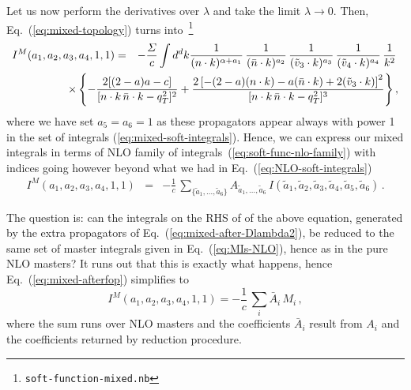 \documentclass[a4paper,11pt]{report}
\numberwithin{equation}{section}
\newcommand{\mixed}{{M}}
\newcommand{\mycite}[1]{{\footnote{\tt  #1}}}
\begin{document}
Let us now perform the derivatives over $\lambda$ and take the limit $\lambda
\to 0$.  Then, Eq.~(\ref{eq:mixed-topology}) turns
into~\mycite{soft-function-mixed.nb}
%
\begin{eqnarray}
  I^\mixed(a_1, a_2, a_3, a_4, 1, 1)
  & = &
  - \frac{\Sigma}{c}
  \int d^d k
  \frac{1}{(n\cdot k)^{\alpha+a_1}}\,
  \frac{1}{(\nbar \cdot k)^{a_2}}\,
  \frac{1}{(\tilde v_3 \cdot k)^{a_3}}\,
  \frac{1}{(\tilde v_4 \cdot k)^{a_4}}\,
  \frac{1}{k^2}\,
  \nonumber \\
  & & 
  \hspace{-70pt}
  \times
  \left\{
    -\frac{2[(2-a)a-c]}{[ n \cdot k\, \nbar \cdot k - q_T^2]^{2}}
    +\frac{2\left[-(2-a) (n\cdot k) -a (\nbar\cdot k)+ 
    2(\tilde v_3\cdot k)\right]^2}{[ n \cdot k\, \nbar \cdot k - 
    q_T^2]^{3}}
  \right\},
  \label{eq:mixed-after-Dlambda2}
\end{eqnarray}
%
where we have set $a_5=a_6=1$ as these propagators appear always with power 1 in
the set of integrals (\ref{eq:mixed-soft-integrals}).
%
Hence, we can express our mixed integrals in terms of NLO family of
integrals~(\ref{eq:soft-func-nlo-family}) with indices going however beyond what
we had in Eq.~(\ref{eq:NLO-soft-integrals})
%
\begin{eqnarray}
  I^\mixed(a_1, a_2, a_3, a_4, 1, 1)
  & = &
  - \frac{1}{c}\, \sum_{\{\tilde a_1, \ldots, \tilde a_6\}} 
  A_{\tilde a_1, \ldots, \tilde a_6}\, 
  I(\tilde a_1, \tilde a_2, \tilde a_3, \tilde a_4, \tilde a_5, \tilde a_6)\,.
  \label{eq:mixed-afterfop}
\end{eqnarray}

The question is: can the integrals on the RHS of of the above equation,
generated by the extra propagators of Eq.~(\ref{eq:mixed-after-Dlambda2}), be
reduced to the same set of master integrals given in Eq.~(\ref{eq:MIs-NLO}),
hence as in the pure NLO masters? 
%
It runs out that this is exactly what happens, hence
Eq.~(\ref{eq:mixed-afterfop}) simplifies to
%
\begin{equation}
  I^\mixed(a_1, a_2, a_3, a_4, 1, 1)
   = 
  - \frac{1}{c}\, \sum_{i} 
  \bar A_{i}\, M_i\,,
\end{equation}
%
where the sum runs over NLO masters and the coefficients $\bar A_i$ result from
$A_i$ and the coefficients returned by reduction procedure.
\end{document}
